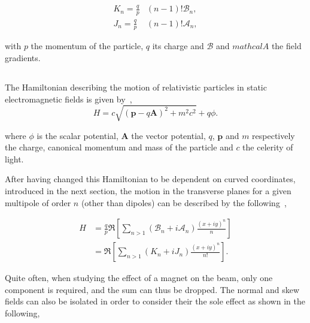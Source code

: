 \begin{equation}
    \begin{aligned}
        K_n =  \frac{q}{p} &(n-1)! \mathcal{B}_n, \\ 
        J_n =  \frac{q}{p} &(n-1)! \mathcal{A}_n,
    \end{aligned}
    \label{eq:magnetic_fields_normalized}
\end{equation}

with $p$ the momentum of the particle, $q$ its charge and $\mathcal{B}$ and $mathcal{A}$ the field
gradients.


\subsection{}

The Hamiltonian describing the motion of relativistic particles in static electromagnetic fields is
given by~\cite{wolski_beam_2014},
\begin{equation}
    H = c \sqrt{(\mathbf{p}-q\mathbf{A})^2 + m^2c^2} + q\phi.
\end{equation}

where $\phi$ is the scalar potential, $\mathbf{A}$ the vector potential, $q$, $\mathbf{p}$ and $m$
respectively the charge, canonical momentum and mass of the particle and $c$ the celerity of light.

After having changed this Hamiltonian to be dependent on curved coordinates, introduced in the next
section, the motion in the transverse planes for a given multipole of order $n$ (other than dipoles)
can be described by the following~\cite{wolski_beam_2014},

\begin{equation}
    \begin{aligned}
        H &= \frac{q}{p} \Re \left[ \sum_{n>1} (\mathcal{B}_n + i\mathcal{A}_n) \frac{(x+iy)^n}{n} \right] \\
          &= \Re \left[ \sum_{n>1} (K_n + iJ_n) \frac{(x+iy)^n}{n!} \right].
    \end{aligned}
    \label{eq:hamiltonian_magnet}
\end{equation}

Quite often, when studying the effect of a magnet on the beam, only one component is required, and
the sum can thus be dropped.
The normal and skew fields can also be isolated in order to consider their the sole effect as shown
in the following,

